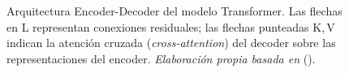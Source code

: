 \begin{figure}[H]
\caption[Arquitectura Encoder-Decoder del modelo Transformer.]{Arquitectura Encoder-Decoder del modelo Transformer. Las flechas en L representan conexiones residuales; las flechas punteadas K,\,V indican la atención cruzada (\textit{cross-attention}) del decoder sobre las representaciones del encoder. \footnotesize\textit{Elaboración propia basada en} \protect\citeauthor{vaswani2017attention} (\protect\citeyear{vaswani2017attention}).}
\label{fig:transformer_arch}
\end{figure}

